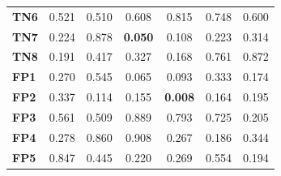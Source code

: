 \begin{table}
\begin{tabular}{lccc|ccc}
        \textbf{TN6}  & 0.521                                   & 0.510                                             & 0.608                                  & 0.815                                    & 0.748                                  & 0.600                                  \\
        \textbf{TN7}  & 0.224                                   & 0.878                                             & \cellcolor[HTML]{EFEFEF}\textbf{0.050} & 0.108                                    & 0.223                                  & 0.314                                  \\
        \textbf{TN8}  & 0.191                                   & 0.417                                             & 0.327                                  & 0.168                                    & 0.761                                  & 0.872                                  \\
        \textbf{FP1}  & 0.270                                   & 0.545                                             & 0.065                                  & 0.093                                    & 0.333                                  & 0.174                                  \\
        \textbf{FP2}  & 0.337                                   & 0.114                                             & 0.155                                  & \cellcolor[HTML]{EFEFEF}\textbf{0.008}   & 0.164                                  & 0.195                                  \\
        \textbf{FP3}  & 0.561                                   & 0.509                                             & 0.889                                  & 0.793                                    & 0.725                                  & 0.205                                  \\
        \textbf{FP4}  & 0.278                                   & 0.860                                             & 0.908                                  & 0.267                                    & 0.186                                  & 0.344                                  \\
        \textbf{FP5}  & 0.847                                   & 0.445                                             & 0.220                                  & 0.269                                    & 0.554                                  & 0.194                                  \\

\end{tabular}
\end{table}
